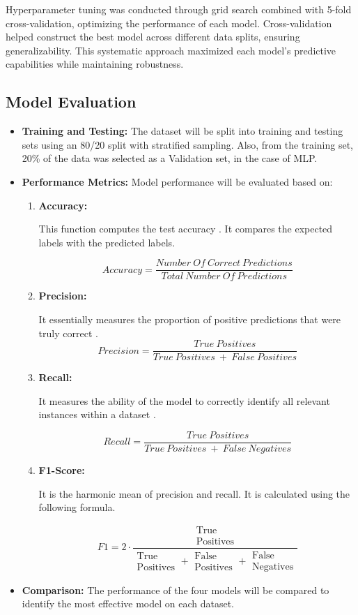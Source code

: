 \documentclass[conference]{IEEEtran}
\begin{document}
Hyperparameter tuning was conducted through grid search combined with 5-fold cross-validation, optimizing the performance of each model. Cross-validation helped construct the best model across different data splits, ensuring generalizability. This systematic approach maximized each model’s predictive capabilities while maintaining robustness.
\subsection{Model Evaluation}

\begin{itemize}

\item \textbf{Training and Testing:} The dataset will be split into training and testing sets using an 80/20 split with stratified sampling. Also, from the training set, 20\% of the data was selected as a Validation set, in the case of MLP.

\item \textbf{Performance Metrics:} Model performance will be evaluated based on:
\begin{enumerate}
\item \textbf{Accuracy:}

This function computes the test accuracy \cite{accuracy_score}. It compares the expected labels with the predicted labels.

\[Accuracy=\frac{Number\ Of\ Correct\ Predictions}{Total\ Number\ Of\ Predictions}\]
\item  \textbf{Precision:} 

It essentially measures the proportion of positive predictions that were truly correct \cite{precision_score}.
\[Precision=\frac{True\ Positives}{True\ Positives\ +\ False\ Positives}\]

\item  \textbf{Recall:}

 It measures the ability of the model to correctly identify all relevant instances within a dataset \cite{recall_score}.

 \[Recall=\frac{True\ Positives}{True\ Positives\ +\ False\ Negatives}\]
 
 \item \textbf{F1-Score:}

 It is the harmonic mean of precision and recall\cite{sklearn_f1_score}. It is calculated using the following formula.
 
 \[F1 = 2 \cdot \frac{\substack{\text{True} \\ \text{Positives}}}{\substack{\text{True} \\ \text{Positives}} + \substack{\text{False} \\ \text{Positives}} + \substack{\text{False} \\ \text{Negatives}}}\]

\end{enumerate}
\item \textbf{Comparison:} The performance of the four models will be compared to identify the most effective model on each dataset.
\end{itemize}
\end{document}
